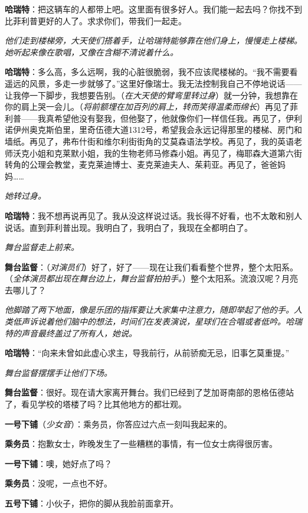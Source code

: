 \documentclass[lang=cn,newtx,12pt,scheme=chinese]{elegantbook}
\begin{document}
\textbf{哈瑞特}：把这辆车的人都带上吧。这里面有很多好人。我们能一起去吗？你找不到比菲利普更好的人了。求求你们，带我们一起走。

\textit{他们走到楼梯旁，大天使们搭着手，让哈瑞特能够靠在他们身上，慢慢走上楼梯。她听起来像在歌唱，又像在含糊不清说着什么。}

\textbf{哈瑞特}：多么高，多么远啊，我的心脏很脆弱，我不应该爬楼梯的。“我不需要看遥远的风景，多走一步就够了。”这里好像瑞士。我无法控制我自己不停地说话——让我停一下脚步，我想要告别。（\textit{在大天使的臂弯里转过身}）就一分钟，我想靠在你的肩上哭一会儿。（\textit{将前额埋在加百列的肩上，转而笑得温柔而绵长}）再见了菲利普——我真希望他没有娶我，但他娶了，他就像你们一样信任我。再见了，伊利诺伊州奥克斯伯里，里奇伍德大道1312号，希望我会永远记得那里的楼梯、房门和墙纸。再见了，弗布什街和维尔利街街角的艾莫森语法学校。再见了，我的英语老师沃克小姐和克莱默小姐，我的生物老师马修森小姐。再见了，梅耶森大道第六街转角的公理会教堂，麦克莱迪博士、麦克莱迪夫人、茱莉亚。再见了，爸爸妈妈……

\textit{她转过身。}

\textbf{哈瑞特}：我不想再说再见了。我从没这样说过话。我长得不好看，也不太敢和别人说话。直到菲利普出现。我明白了，我明白了，我现在全都明白了。

\textit{舞台监督走上前来。}

\textbf{舞台监督}：（\textit{对演员们}）好了，好了——现在让我们看看整个世界，整个太阳系。（\textit{全体演员都出现在舞台边上，舞台监督拍拍手。}）整个太阳系。流浪汉呢？月亮去哪儿了？

\textit{他脚踏了两下地面，像是乐团的指挥要让大家集中注意力，随即举起了他的手。人类低声诉说着他们脑中的想法，时间们在发表演说，星球们在合唱或者低吟。哈瑞特的声音最终盖过了所有人，她说。}

\textbf{哈瑞特}：“向来未曾如此虚心求主，导我前行，从前骄痴无忌，旧事乞莫重提。”

\textit{舞台监督摆摆手让他们下场。}

\textbf{舞台监督}：很好。现在请大家离开舞台。我们已经到了芝加哥南部的恩格伍德站了，看见学校的塔楼了吗？比其他地方的都壮观。

\textbf{一号下铺}（\textit{少女音}）：乘务员，你答应过六点一刻叫我起来的。

\textbf{乘务员}：抱歉女士，昨晚发生了一些糟糕的事情，有一位女士病得很厉害。

\textbf{一号下铺}：噢，她好点了吗？

\textbf{乘务员}：没呢，一点也不好。

\textbf{五号下铺}：小伙子，把你的脚从我脸前面拿开。
\end{document}

